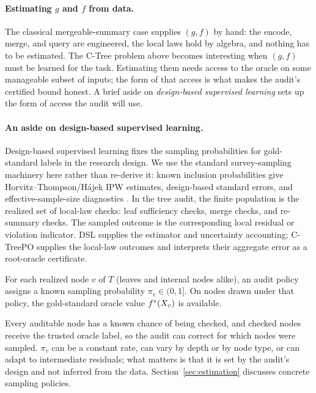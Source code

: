 \paragraph{Estimating \(g\) and \(f\) from data.}
The classical mergeable-summary case supplies \((g,f)\) by hand: the
encode, merge, and query are engineered, the local laws hold by
algebra, and nothing has to be estimated. The C-Tree problem above
becomes interesting when \((g,f)\) must be learned for the task.
Estimating them needs access to the oracle on some manageable subset
of inputs; the form of that access is what makes the audit's certified
bound honest. A brief aside on \emph{design-based supervised learning}
sets up the form of access the audit will use.

\paragraph{An aside on design-based supervised learning.}
Design-based supervised learning fixes the sampling probabilities for
gold-standard labels in the research design. We use the standard
survey-sampling machinery here rather than re-derive it: known
inclusion probabilities give Horvitz--Thompson/H\'ajek IPW estimates,
design-based standard errors, and effective-sample-size diagnostics
\citep{HorvitzThompson1952,Kish1965SurveySampling,SarndalEtAl1992,EgamiEtAl2024}.
In the tree audit, the finite population is the realized set of local-law
checks: leaf sufficiency checks, merge checks, and re-summary checks. The
sampled outcome is the corresponding local residual or violation indicator.
DSL supplies the estimator and uncertainty accounting; C-TreePO supplies the
local-law outcomes and interprets their aggregate error as a root-oracle
certificate.

\begin{assumption}
\label{ass:v7-dsl}
For each realized node \(v\) of \(T\) (leaves and internal nodes
alike), an audit policy assigns a known sampling probability
\(\pi_v\in(0,1]\). On nodes drawn under that policy, the
gold-standard oracle value \(f^\ast(X_v)\) is available.
\end{assumption}

Every auditable node has a known chance of being checked, and
checked nodes receive the trusted oracle label, so the audit can
correct for which nodes were sampled. \(\pi_v\) can be a constant
rate, can vary by depth or by node type, or can adapt to intermediate
residuals; what matters is that it is set by the audit's design and
not inferred from the data. Section~\ref{sec:estimation}
discusses concrete sampling policies.

